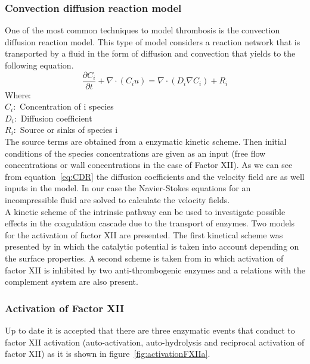 \documentclass[%
 nofootinbib,
 amsmath,amssymb,
 aps,
 pra,
]{revtex4-1}
\begin{document}
\subsubsection{Convection diffusion reaction model}
One of the most common techniques to model thrombosis is the convection diffusion reaction model. This type of model considers a reaction network that is transported by a fluid in the form of diffusion and convection that yields to the following equation. 
\begin{equation}\label{eq:CDR}
\frac{\partial C_{i}}{\partial t} + \nabla \cdot (C_{i}u)  = \nabla \cdot (D_{i} \nabla C_{i}) + R_{i}
\end{equation}
Where: \\
$C_{i} : $ Concentration of i species \\
$D_{i} : $ Diffusion coefficient \\
$R_{i} : $ Source or sinks of species i \\
The source terms are obtained from a enzymatic kinetic scheme. Then initial conditions of the species concentrations are given as an input (free flow concentrations or wall concentrations in the case of Factor XII). As we can see from equation~\ref{eq:CDR} the diffusion coefficients and the velocity field are as well inputs in the model. In our case the Navier-Stokes equations for an incompressible fluid are solved to calculate the velocity fields.\\
A kinetic scheme of the intrinsic pathway can be used to investigate possible effects in the coagulation cascade due to the transport of enzymes. Two models for the activation of factor XII are presented. The first kinetical scheme was presented by \citet{Guo:2006} in which the catalytic potential is taken into account depending on the surface properties. A second scheme is taken from \citet{Chatterjee:2010} in which activation of factor XII is inhibited by two anti-thrombogenic enzymes  and a relations with the complement system are also present.
\subsubsection{Activation of Factor XII}
Up to date it is accepted that there are three enzymatic events that conduct to factor XII activation (auto-activation, auto-hydrolysis  and reciprocal activation of factor XII) as it is shown in figure~\ref{fig:activationFXIIa}.\\
\end{document}
